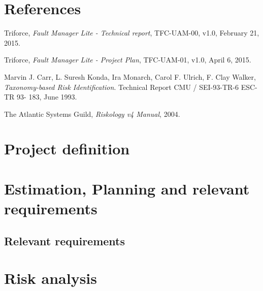 \documentclass[11pt]{report}
\begin{document}
\chapter{References}
\label{chapReferences}
\let\oldchapter\chapter
\renewcommand{\chapter}[2]{}
\begin{thebibliography}{9}
	Triforce,
	\emph{Fault Manager Lite - Technical report},
	TFC-UAM-00,
	v1.0,
	February 21, 2015.

	Triforce,
	\emph{Fault Manager Lite - Project Plan},
	TFC-UAM-01,
	v1.0,
	April 6, 2015.

	Marvin J. Carr, L. Suresh Konda, Ira Monarch, Carol F. Ulrich, F. Clay Walker,
	\emph{Taxonomy-based Risk Identification}.
	Technical Report CMU / SEI-93-TR-6 ESC-TR 93- 183,
	June 1993.

	The Atlantic Systems Guild,
	\emph{Riskology v4 Manual},
	2004.

\end{thebibliography}
\let\chapter\oldchapter

\chapter{Project definition}
\label{chapDef}


\chapter{Estimation, Planning and relevant requirements}
\label{chapPlan}


\newpage
\section{Relevant requirements}


\chapter{Risk analysis}
\label{chapRiskAnalysis}
\end{document}
